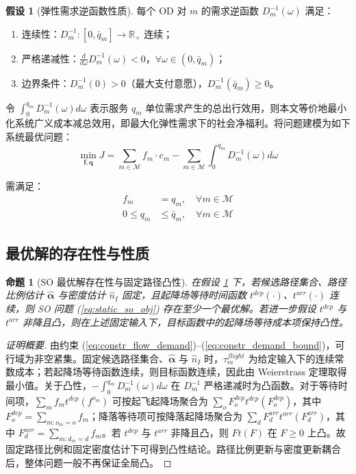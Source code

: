 \documentclass[a4paper,12pt]{article}
\theoremstyle{plain}
\newtheorem{proposition}[theorem]{命题}
\theoremstyle{definition}
\newtheorem{assumption}[theorem]{假设}
\theoremstyle{remark}
\begin{document}
\begin{assumption}[弹性需求逆函数性质]\label{asm:demand_inverse}
每个 OD 对 $m$ 的需求逆函数 $D_m^{-1}(\omega)$ 满足：
\begin{enumerate}
    \item 连续性：$D_m^{-1}: [0, \bar{q}_m] \to \mathbb{R}_+$ 连续；
    \item 严格递减性：$\frac{d}{d\omega}D_m^{-1}(\omega) < 0$，$\forall \omega \in (0, \bar{q}_m)$；
    \item 边界条件：$D_m^{-1}(0) > 0$（最大支付意愿），$D_m^{-1}(\bar{q}_m) \ge 0$。
\end{enumerate}
\end{assumption}

令 $\int_0^{q_m}D_m^{-1}(\omega)d\omega$ 表示服务 $q_m$ 单位需求产生的总出行效用，则本文等价地最小化系统广义成本减总效用，即最大化弹性需求下的社会净福利。将问题建模为如下系统最优问题：
\begin{equation} \label{eq:static_so_obj}
    \min_{\bm{f}, \bm{q}} J = \sum_{m \in \mathcal{M}} f_m \cdot c_m - \sum_{m \in \mathcal{M}} \int_{0}^{q_m} D_m^{-1}(\omega) d\omega
\end{equation}

需满足：
\begin{align}
    f_m &= q_m, \quad \forall m \in \mathcal{M} \label{eq:constr_flow_demand}\\
    0 \le q_m &\le \bar{q}_m, \quad \forall m \in \mathcal{M} \label{eq:constr_demand_bound}
\end{align}

\subsection{最优解的存在性与性质}

\begin{proposition}[SO 最优解存在性与固定路径凸性]\label{prop:so_convexity}
在假设 \ref{asm:demand_inverse} 下，若候选路径集合、路径比例估计 $\widehat{\bm\alpha}$ 与密度估计 $\hat n_I$ 固定，且起降场等待时间函数 $t^{dep}(\cdot)$、$t^{arr}(\cdot)$ 连续，则 SO 问题 (\ref{eq:static_so_obj}) 存在至少一个最优解。若进一步假设 $t^{dep}$ 与 $t^{arr}$ 非降且凸，则在上述固定输入下，目标函数中的起降场等待成本项保持凸性。
\end{proposition}

\begin{proof}[证明概要]
由约束 (\ref{eq:constr_flow_demand})--(\ref{eq:constr_demand_bound})，可行域为非空紧集。固定候选路径集合、$\widehat{\bm\alpha}$ 与 $\hat n_I$ 时，$\tau_m^{flight}$ 为给定输入下的连续常数成本；若起降场等待函数连续，则目标函数连续，因此由 Weierstrass 定理取得最小值。关于凸性，$-\int_0^{q_m}D_m^{-1}(\omega)d\omega$ 在 $D_m^{-1}$ 严格递减时为凸函数。对于等待时间项，$\sum_m f_m t^{dep}(f^{o_m})$ 可按起飞起降场聚合为 $\sum_o F_o^{dep} t^{dep}(F_o^{dep})$，其中 $F_o^{dep}=\sum_{m:o_m=o}f_m$；降落等待项可按降落起降场聚合为 $\sum_d F_d^{arr} t^{arr}(F_d^{arr})$，其中 $F_d^{arr}=\sum_{m:d_m=d}f_m$。若 $t^{dep}$ 与 $t^{arr}$ 非降且凸，则 $F t(F)$ 在 $F\ge 0$ 上凸。故固定路径比例和固定密度估计下可得到凸性结论。路径比例更新与密度更新耦合后，整体问题一般不再保证全局凸。
\end{proof}
\end{document}
